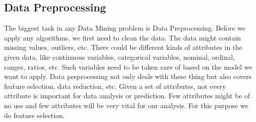 \documentclass[fleqn,10pt]{SelfArx} %
\begin{document}
\subsection{Data Preprocessing}
The biggest task in any Data Mining problem is Data Preprocessing. Before we apply any algorithms, we first need to clean the data. The data might contain missing values, outliers, etc. There could be different kinds of attributes in the given data, like continuous variables, categorical variables, nominal, ordinal, ranges, ratios, etc. Such variables need to be taken care of based on the model we want to apply. Data preprocessing not only deals with these thing but also covers feature selection, data reduction, etc. Given a set of attributes, not every attribute is important for data analysis or prediction. Few attributes might be of no use and few attributes will be very vital for our analysis. For this purpose we do feature selection.
\end{document}
